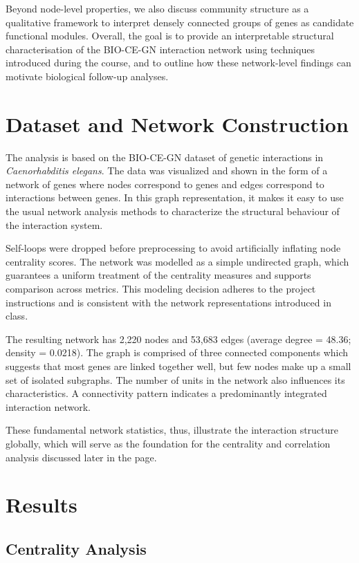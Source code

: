 Beyond node-level properties, we also discuss community structure as a qualitative framework to interpret densely connected groups of genes as candidate functional modules. Overall, the goal is to provide an interpretable structural characterisation of the BIO-CE-GN interaction network using techniques introduced during the course, and to outline how these network-level findings can motivate biological follow-up analyses.

\section{Dataset and Network Construction}

The analysis is based on the BIO-CE-GN dataset of genetic interactions in \textit{Caenorhabditis elegans}. The data was visualized and shown in the form of a network of genes where nodes correspond to genes and edges correspond to interactions between genes. In this graph representation, it makes it easy to use the usual network analysis methods to characterize the structural behaviour of the interaction system.

Self-loops were dropped before preprocessing to avoid artificially inflating node centrality scores. The network was modelled as a simple undirected graph, which guarantees a uniform treatment of the centrality measures and supports comparison across metrics. This modeling decision adheres to the project instructions and is consistent with the network representations introduced in class.

The resulting network has 2,220 nodes and 53,683 edges (average degree = 48.36; density = 0.0218). The graph is comprised of three connected components which suggests that most genes are linked together well, but few nodes make up a small set of isolated subgraphs. The number of units in the network also influences its characteristics. A connectivity pattern indicates a predominantly integrated interaction network.

These fundamental network statistics, thus, illustrate the interaction structure globally, which will serve as the foundation for the centrality and correlation analysis discussed later in the page.

\section{Results}

\subsection{Centrality Analysis}

